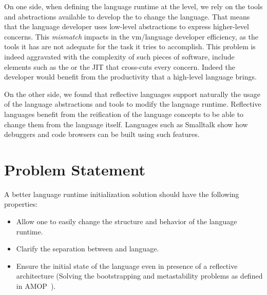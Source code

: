 On one side, when defining the language runtime at the \VM level, we rely on the tools and abstractions available to develop the \VM to change the language. That means that the language developer uses low-level abstractions to express higher-level concerns. This \emph{mismatch} impacts in the vm/language developer efficiency, as the tools it has are not adequate for the task it tries to accomplish. This problem is indeed aggravated with the complexity of such pieces of software, include elements such as the \GC or the JIT that cross-cuts every \VM concern. Indeed the developer would benefit from the productivity that a high-level language brings.


On the other side, we found that reflective languages support naturally the usage of the language abstractions and tools to modify the language runtime. Reflective languages benefit from the reification of the language concepts to be able to change them from the language itself. Languages such as Smalltalk show how debuggers and code browsers can be built using such features.


\section{Problem Statement}

A better language runtime initialization solution should have the following properties:
\begin{itemize}
\item Allow one to easily change the structure and behavior of the language runtime.
\item Clarify the separation between \VM and language.
\item Ensure the initial state of the language even in presence of a reflective architecture (Solving the bootstrapping and metastability problems as defined in AMOP~\cite{Kicz91a}).
\end{itemize}

